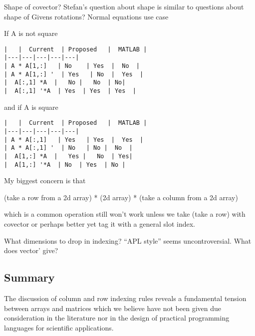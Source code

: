 Shape of covector?
Stefan's question about shape is similar to questions about shape of Givens rotations?
Normal equations use case


If A is not square


\begin{verbatim}
|   |  Current  | Proposed   |  MATLAB |
|---|---|---|---|---|
| A * A[1,:]   | No    | Yes  |  No  |
| A * A[1,:] '  | Yes   | No  |  Yes  |
|  A[:,1] *A  |   No |   No  | No|
|  A[:,1] '*A  | Yes  | Yes  | Yes  |
\end{verbatim}


and if A is square


\begin{verbatim}
|   |  Current  | Proposed   |  MATLAB |
|---|---|---|---|---|
| A * A[:,1]   | Yes   | Yes  |  Yes  |
| A * A[:,1] '  | No   | No |  No  |
|  A[1,:] *A  |   Yes |   No  | Yes|
|  A[1,:] '*A  | No  | Yes  | No |
\end{verbatim}

My biggest concern is that

(take a row from a 2d array) * (2d array) * (take a column from a 2d array)

which is a common operation still won't work unless we take
(take a row) with covector or perhaps better yet
tag it with a general slot index.

What dimensions to drop in indexing? ``APL style'' seems uncontroversial.
What does vector' give?




\subsection{Summary}

The discussion of column and row indexing rules reveals a fundamental tension
between arrays and matrices which we believe have not been given due
consideration in the literature nor in the design of practical programming
languages for scientific applications.
